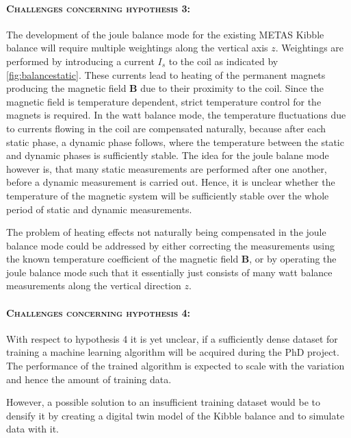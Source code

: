 \documentclass{article}
\newcommand\vect[1]{\ensuremath{\bm{#1}}}
\begin{document}
\paragraph*{\normalfont \textsc{Challenges concerning hypothesis 3:}} The development of the joule balance mode for the existing METAS Kibble balance will require multiple weightings along the vertical axis $z$. Weightings are performed by introducing a current $I_s$ to the coil as indicated by \cref{fig:balancestatic}. These currents lead to heating of the permanent magnets producing the magnetic field $\vect{B}$ due to their proximity to the coil. Since the magnetic field is temperature dependent, strict temperature control for the magnets is required. In the watt balance mode, the temperature fluctuations due to currents flowing in the coil are compensated naturally, because after each static phase, a dynamic phase follows, where the temperature between the static and dynamic phases is sufficiently stable. The idea for the joule balane mode however is, that many static measurements are performed after one another, before a dynamic measurement is carried out. Hence, it is unclear whether the temperature of the magnetic system will be sufficiently stable over the whole period of static and dynamic measurements.

The problem of heating effects not naturally being compensated in the joule balance mode could be addressed by either correcting the measurements using the known temperature coefficient of the magnetic field $\vect{B}$, or by operating the joule balance mode such that it essentially just consists of many watt balance measurements along the vertical direction $z$.

\paragraph*{\normalfont \textsc{Challenges concerning hypothesis 4:}} With respect to hypothesis 4 it is yet unclear, if a sufficiently dense dataset for training a machine learning algorithm will be acquired during the PhD project. The performance of the trained algorithm is expected to scale with the variation and hence the amount of training data.

However, a possible solution to an insufficient training dataset would be to densify it by creating a digital twin model of the Kibble balance and to simulate data with it.


\end{document}
